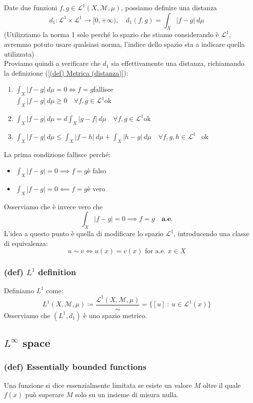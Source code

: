 Date due funzioni $f,g\in \mathcal L^1(X,\mathcal M,\mu)$, possiamo definire una distanza $$d_1:\mathcal L^1\times \mathcal L^1\to [0,+\infty), \quad d_1(f,g)=\int_X|f-g|\mathrm \ d\mu$$
(Utilizziamo la norma 1 solo perché lo spazio che stiamo considerando è $\mathcal L^1$, avremmo potuto usare qualsiasi norma, l'indice dello spazio sta a indicare quella utilizzata)\\
Proviamo quindi a verificare che $d_1$ sia effettivamente una distanza, richiamando la definizione (\ref{(def) Metrica (distanza)}):
\begin{enumerate}
    \item $\int_X|f-g|\mathrm \ d\mu=0\iff f=g$\myquad[15] fallisce\\
     $\int_X|f-g|\mathrm \ d\mu\geq 0 \quad \forall f,g\in \mathcal L^1$\myquad[15] ok
    \item $\int_X|f-g|\mathrm \ d\mu=d\int_X|g-f|\mathrm \ d\mu\quad \forall f,g\in \mathcal L^1$\myquad[9] ok
    \item $\int_X|f-g|\mathrm \ d\mu\leq \int_X|f-h|\mathrm \ d\mu+\int_X|h-g|\mathrm \ d\mu\quad \forall f,g,h\in \mathcal L^1$ \quad\  ok
\end{enumerate}
La prima condizione fallisce perché:
\begin{itemize}
    \item $\int_X |f-g|=0\implies f=g$\quad è falso
    \item $\int_X |f-g|=0\impliedby f=g$\quad è vero
\end{itemize}
Osserviamo che è invece vero che $$\int_X |f-g|=0\implies f=g \quad \textbf{a.e.}$$
L'idea a questo punto è quella di modificare lo spazio $\mathcal L^1$, introducendo una classe di equivalenza:
$$u\sim v\iff u(x)=v(x) \text{ for a.e. } x\in X$$
\subsubsection{(def) $L^1$ definition}
Definiamo $L^1$ come:
$$L^1(X,\mathcal M,\mu)\coloneqq \frac{\mathcal L^1(X,\mathcal M,\mu)}\sim =\{[u]\ :\ u\in \mathcal L^1(x)\}$$
Osserviamo che $(L^1, d_1)$ è uno spazio metrico.
\subsection{$L^\infty$ space}
\subsubsection{(def) Essentially bounded functions}
Una funzione si dice essenzialmente limitata se esiste un valore $M$ oltre il quale $f(x)$ può superare $M$ solo su un insieme di misura nulla.

